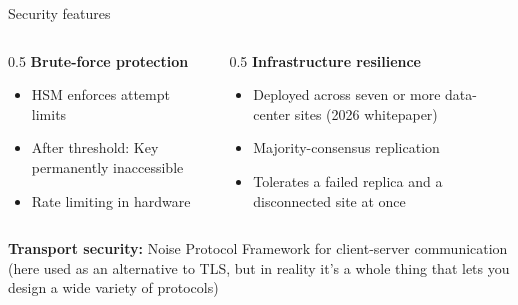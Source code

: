 \ifdefined\PRESENTATION\else\PassOptionsToClass{handout}{beamer}\fi\documentclass[aspectratio=169, lualatex]{beamer}
\begin{document}
\begin{frame}{Security features}
	\begin{columns}[c]
		\begin{column}{0.5\textwidth}
			\textbf{Brute-force protection}
			\begin{itemize}
				\item HSM enforces attempt limits
				\item After threshold: Key permanently inaccessible
				\item Rate limiting in hardware
			\end{itemize}
		\end{column}
		\begin{column}{0.5\textwidth}
			\textbf{Infrastructure resilience}
			\begin{itemize}
				\item Deployed across seven or more data-center sites (2026 whitepaper)
				\item Majority-consensus replication
				\item Tolerates a failed replica and a disconnected site at once
			\end{itemize}
		\end{column}
	\end{columns}
	\vspace{0.5cm}
	\begin{center}
		\textbf{Transport security:} Noise Protocol Framework for client-server communication (here used as an alternative to TLS, but in reality it's a whole thing that lets you design a wide variety of protocols)
	\end{center}
\end{frame}
\end{document}
